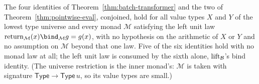 \begin{theorem}
\label{thm:batch-exactness}
\leanok
The four identities of Theorem~\ref{thm:batch-transformer} and the two
of Theorem~\ref{thm:pointwise-eval}, conjoined, hold for all value
types $X$ and $Y$ of the lowest type universe and every monad
$\mathcal M$ satisfying the left unit law
$\Ret_{\mathcal M}(x) \bind_{\mathcal M} g = g(x)$, with no hypothesis
on the arithmetic of $X$ or $Y$ and no assumption on $\mathcal M$ beyond
that one law. Five of the six identities hold with no monad law at all;
the left unit law is consumed by the sixth alone,
$\mathrm{lift}_{\mathcal B}$'s bind identity. (The universe restriction
is the inner monad's: $\mathcal M$ is taken with signature
$\mathsf{Type} \to \mathsf{Type}\,u$, so its value types are small.)
\end{theorem}

